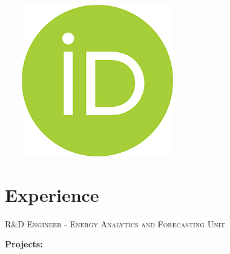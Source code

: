 \documentclass{mycv}
\begin{document}
\begin{center}
	\ \ \ \
	\href{https://orcid.org/0000-0001-8170-8235}{\includegraphics[scale=0.08]{figs/orcid_logo.png}}

\end{center}


\section{Experience}
\textsc{R\&D Engineer - Energy Analytics and Forecasting Unit}

\vspace{0.4cm}

\textbf{Projects:}
\end{document}
